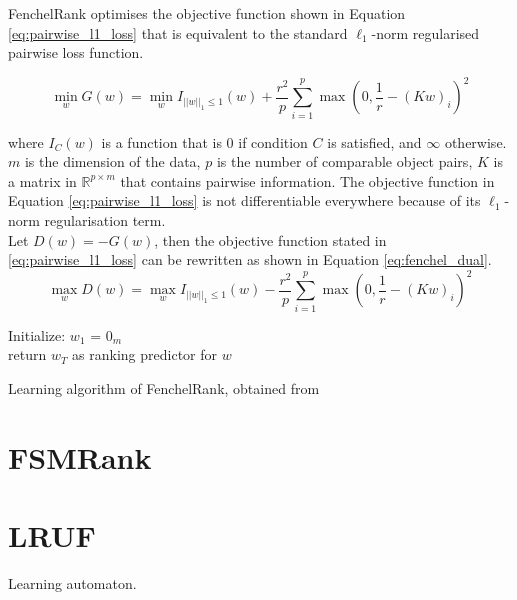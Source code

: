 FenchelRank optimises the objective function shown in Equation \ref{eq:pairwise_l1_loss} that is equivalent to the standard $\ell_1$-norm regularised pairwise loss function.

\begin{equation}
\min_w G(w) = \min_w I_{||w||_{1} \le 1}(w) + \frac{r^2}{p} \sum\limits_{i=1}^{p}\max(0,\frac{1}{r}-(Kw)_i)^2
\label{eq:pairwise_l1_loss}
\end{equation}

\noindent where $I_{C}(w)$ is a function that is 0 if condition $C$ is satisfied, and $\infty$ otherwise. $m$ is the dimension of the data, $p$ is the number of comparable object pairs, $K$ is a matrix in $\mathbb{R}^{p \times m}$ that contains pairwise information. The objective function in Equation \ref{eq:pairwise_l1_loss} is not differentiable everywhere because of its $\ell_1$-norm regularisation term.\\

Let $D(w) = -G(w)$, then the objective function stated in \ref{eq:pairwise_l1_loss} can be rewritten as shown in Equation \ref{eq:fenchel_dual}.
\begin{equation}
\max_w D(w) = \max_w I_{||w||_{1} \le 1}(w) - \frac{r^2}{p} \sum\limits_{i=1}^{p}\max(0,\frac{1}{r}-(Kw)_i)^2
\label{eq:fenchel_dual}
\end{equation}


\LinesNumbered
\begin{algorithm}[H]
 Initialize: $w_1$ = $0_m$\\
 return $w_{T}$ as ranking predictor for $w$
 \caption{Learning algorithm of FenchelRank, obtained from \cite{Lai2013}}
 \label{alg:fenchelrank}
\end{algorithm}
\section{FSMRank}

\section{LRUF}
Learning automaton.